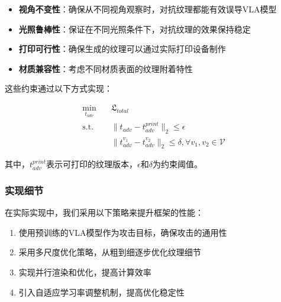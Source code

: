 \begin{itemize}
    \item \textbf{视角不变性}：确保从不同视角观察时，对抗纹理都能有效误导VLA模型
    \item \textbf{光照鲁棒性}：保证在不同光照条件下，对抗纹理的效果保持稳定
    \item \textbf{打印可行性}：确保生成的纹理可以通过实际打印设备制作
    \item \textbf{材质兼容性}：考虑不同材质表面的纹理附着特性
\end{itemize}

这些约束通过以下方式实现：

\begin{equation}
    \begin{aligned}
    \min_{t_{adv}} &\quad \mathfrak{L}_{total}\\
    \mathrm{s.t.} &\quad \|t_{adv} - t_{adv}^{print}\|_2 \leq \epsilon\\
    &\quad \|t_{adv}^{v_1} - t_{adv}^{v_2}\|_2 \leq \delta, \forall v_1,v_2 \in \mathcal{V}
    \end{aligned}
\end{equation}

其中，$t_{adv}^{print}$表示可打印的纹理版本，$\epsilon$和$\delta$为约束阈值。

\subsubsection{实现细节}
在实际实现中，我们采用以下策略来提升框架的性能：

\begin{enumerate}
    \item 使用预训练的VLA模型作为攻击目标，确保攻击的通用性
    \item 采用多尺度优化策略，从粗到细逐步优化纹理细节
    \item 实现并行渲染和优化，提高计算效率
    \item 引入自适应学习率调整机制，提高优化稳定性
\end{enumerate}

